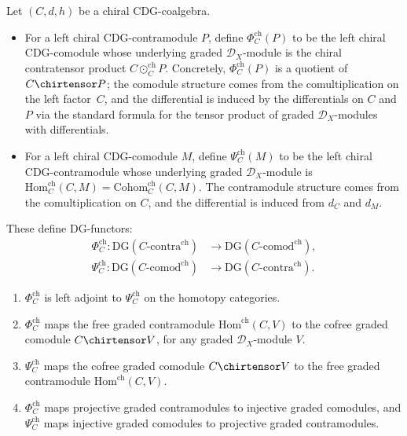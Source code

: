 \begin{definition}
\label{def:chiral-Phi-Psi}
Let $(C, d, h)$ be a chiral CDG-coalgebra.
\begin{itemize}
\item For a left chiral CDG-contramodule $P$, define
 $\Phi_C^{\mathrm{ch}}(P)$ to be the left chiral CDG-comodule
 whose underlying graded $\mathcal{D}_X$-module is the
 chiral contratensor product $C \odot_C^{\mathrm{ch}} P$.
 Concretely, $\Phi_C^{\mathrm{ch}}(P)$ is a quotient of
 $C \chirtensor P$; the comodule structure comes from the
 comultiplication on the left factor~$C$, and the differential is
 induced by the differentials on $C$ and $P$ via the standard
 formula for the tensor product of graded $\mathcal{D}_X$-modules
 with differentials.
\item For a left chiral CDG-comodule $M$, define
 $\Psi_C^{\mathrm{ch}}(M)$ to be the left chiral CDG-contramodule
 whose underlying graded $\mathcal{D}_X$-module is
 $\mathrm{Hom}_C^{\mathrm{ch}}(C, M) = \mathrm{Cohom}_C^{\mathrm{ch}}(C, M)$.
 The contramodule structure comes from the comultiplication
 on $C$, and the differential is induced from $d_C$ and $d_M$.
\end{itemize}
These define DG-functors:
\begin{align*}
\Phi_C^{\mathrm{ch}}\colon \mathrm{DG}(C\text{-}\mathrm{contra}^{\mathrm{ch}})
&\longrightarrow \mathrm{DG}(C\text{-}\mathrm{comod}^{\mathrm{ch}}), \\
\Psi_C^{\mathrm{ch}}\colon \mathrm{DG}(C\text{-}\mathrm{comod}^{\mathrm{ch}})
&\longrightarrow \mathrm{DG}(C\text{-}\mathrm{contra}^{\mathrm{ch}}).
\end{align*}
\end{definition}

\begin{lemma}
\label{lem:Phi-Psi-properties}
\begin{enumerate}[label=\textup{(\alph*)}]
\item $\Phi_C^{\mathrm{ch}}$ is left adjoint to $\Psi_C^{\mathrm{ch}}$
 on the homotopy categories.
\item $\Phi_C^{\mathrm{ch}}$ maps the free graded contramodule
 $\mathrm{Hom}^{\mathrm{ch}}(C, V)$ to the cofree graded comodule
 $C \chirtensor V$, for any graded $\mathcal{D}_X$-module $V$.
\item $\Psi_C^{\mathrm{ch}}$ maps the cofree graded comodule
 $C \chirtensor V$ to the free graded contramodule
 $\mathrm{Hom}^{\mathrm{ch}}(C, V)$.
\item $\Phi_C^{\mathrm{ch}}$ maps projective graded contramodules
 to injective graded comodules, and $\Psi_C^{\mathrm{ch}}$ maps
 injective graded comodules to projective graded contramodules.
\end{enumerate}
\end{lemma}

